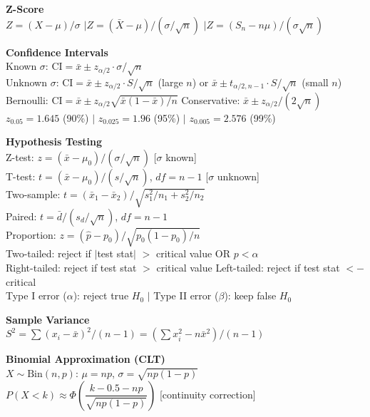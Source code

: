 \documentclass[11pt, letterpaper]{article}
\begin{document}
\begin{cheatbox}
\small
\textbf{Z-Score}\\
$Z = (X - \mu)/\sigma$ \quad$|$\quad $Z = (\bar{X} - \mu)/(\sigma/\sqrt{n})$ \quad$|$\quad $Z = (S_n - n\mu)/(\sigma\sqrt{n})$

\medskip
\textbf{Confidence Intervals}\\
Known $\sigma$: $\text{CI} = \bar{x} \pm z_{\alpha/2} \cdot \sigma/\sqrt{n}$\\
Unknown $\sigma$: $\text{CI} = \bar{x} \pm z_{\alpha/2} \cdot S/\sqrt{n}$ (large $n$) \quad or \quad $\bar{x} \pm t_{\alpha/2,n-1} \cdot S/\sqrt{n}$ (small $n$)\\
Bernoulli: $\text{CI} = \bar{x} \pm z_{\alpha/2} \sqrt{\bar{x}(1-\bar{x})/n}$ \quad Conservative: $\bar{x} \pm z_{\alpha/2}/(2\sqrt{n})$\\
$z_{0.05}=1.645$ (90\%) \;$|$\; $z_{0.025}=1.96$ (95\%) \;$|$\; $z_{0.005}=2.576$ (99\%)

\medskip
\textbf{Hypothesis Testing}\\
Z-test: $z = (\bar{x} - \mu_0)/(\sigma/\sqrt{n})$ [$\sigma$ known]\\
T-test: $t = (\bar{x} - \mu_0)/(s/\sqrt{n})$, $df=n{-}1$ [$\sigma$ unknown]\\
Two-sample: $t = (\bar{x}_1 - \bar{x}_2)/\sqrt{s_1^2/n_1 + s_2^2/n_2}$\\
Paired: $t = \bar{d}/(s_d/\sqrt{n})$, $df=n{-}1$\\
Proportion: $z = (\hat{p} - p_0)/\sqrt{p_0(1-p_0)/n}$\\
Two-tailed: reject if $|$test stat$|$ $>$ critical value OR $p < \alpha$\\
Right-tailed: reject if test stat $>$ critical value \quad Left-tailed: reject if test stat $< -$critical\\
Type I error ($\alpha$): reject true $H_0$ \;$|$\; Type II error ($\beta$): keep false $H_0$

\medskip
\textbf{Sample Variance}\\
$S^2 = \sum(x_i - \bar{x})^2/(n{-}1) = (\sum x_i^2 - n\bar{x}^2)/(n{-}1)$

\medskip
\textbf{Binomial Approximation (CLT)}\\
$X \sim \text{Bin}(n,p)$: $\mu = np$, $\sigma = \sqrt{np(1{-}p)}$\\
$P(X < k) \approx \Phi\!\left(\dfrac{k - 0.5 - np}{\sqrt{np(1{-}p)}}\right)$ [continuity correction]
\end{cheatbox}
\end{document}
